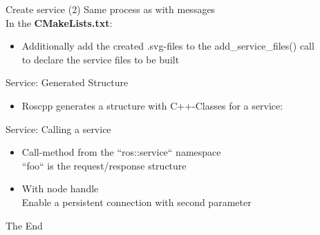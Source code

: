 \documentclass{beamer}
\begin{document}
\begin{frame}{Create service (2)}
	Same process as with messages\\
	In the \textbf{CMakeLists.txt}:\\
	\begin{itemize}
		\item Additionally add the created .svg-files to the add\_service\_files() call\\
		to declare the service files to be built
	\end{itemize}
\end{frame}

\begin{frame}{Service: Generated Structure}
	\begin{itemize}
		\item Roscpp generates a structure with C++-Classes for a service:
			
	\end{itemize}
\end{frame}

\begin{frame}{Service: Calling a service}
	\begin{itemize}
		\item Call-method from the ``ros::service`` namespace\\
		``foo`` is the request/response structure
			
		\item With node handle\\
		Enable a persistent connection with second parameter
		
	\end{itemize}
\end{frame}
\begin{frame}
\Huge{\centerline{The End}}
\end{frame}
\end{document}
